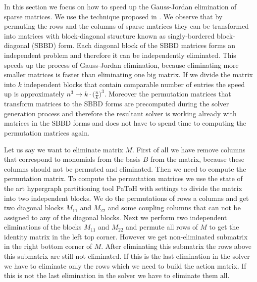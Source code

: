 In this section we focus on how to speed up the Gauss-Jordan elimination of sparse matrices. We use the technique proposed in \cite{SBBD}. We observe that by permuting the rows and the columns of sparse matrices they can be transformed into matrices with block-diagonal structure known as singly-bordered block-diagonal (SBBD) form. Each diagonal block of the SBBD matrices forms an independent problem and therefore it can be independently eliminated. This speeds up the process of Gauss-Jordan elimination, because eliminating more smaller matrices is faster than eliminating one big matrix. If we divide the matrix into $k$ independent blocks that contain comparable number of entries the speed up is approximately $n^3 \rightarrow k\cdot\big(\frac{n}{k}\big)^3$. Moreover the permutation matrices that transform matrices to the SBBD forms are precomputed during the solver generation process and therefore the resultant solver is working already with matrices in the SBBD forms and does not have to spend time to computing the permutation matrices again.

Let us say we want to eliminate matrix $M$. First of all we have remove columns that correspond to monomials from the basis $B$ from the matrix, because these columns should not be permuted and eliminated. Then we need to compute the permutation matrix. To compute the permutation matrices we use the state of the art hypergraph partitioning tool PaToH \cite{PaToH} with settings to divide the matrix into two independent blocks. We do the permutations of rows a columns and get two diagonal blocks $M_{11}$ and $M_{22}$ and some coupling columns that can not be assigned to any of the diagonal blocks. Next we perform two independent eliminations of the blocks $M_{11}$ and $M_{22}$ and permute all rows of $M$ to get the identity matrix in the left top corner. However we get non-eliminated submatrix in the right bottom corner of $M$. After eliminating this submatrix the rows above this submatrix are still not eliminated. If this is the last elimination in the solver we have to eliminate only the rows which we need to build the action matrix. If this is not the last elimination in the solver we have to eliminate them all.

